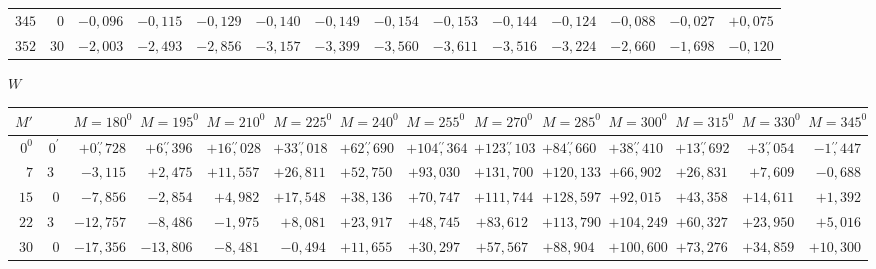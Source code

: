 \begin{landscape}
\begin{longtable}{@{}rr|r|r|r|r|r|r|r|r|r|r|r|r@{}}
\(345\) & \(0\) & \(-0{,}096\) & \(-0{,}115\) & \(-0{,}129\) & \(-0{,}140\) & \(-0{,}149\) & \(-0{,}154\) & \(-0{,}153\) & \(-0{,}144\) & \(-0{,}124\) & \(-0{,}088\) & \(-0{,}027\) & \(+0{,}075\)\\
\(352\) & \(30\) & \(-2{,}003\) & \(-2{,}493\) & \(-2{,}856\) & \(-3{,}157\) & \(-3{,}399\) & \(-3{,}560\) & \(-3{,}611\) & \(-3{,}516\) & \(-3{,}224\) & \(-2{,}660\) & \(-1{,}698\) & \(-0{,}120\)\\
\end{longtable}
\clearpage
\endgroup
\clearpage
\begingroup
\fontsize{8.5}{10.5}\selectfont
{}
\renewcommand{\headrulewidth}{0pt}
\begin{center}\(W\)\end{center}
\setlength{\tabcolsep}{2.5pt}
\renewcommand{\arraystretch}{1.08}
\begin{longtable}{@{}rr|r|r|r|r|r|r|r|r|r|r|r|r@{}}
\hline
\(M'\) & & \(M=180^0\) & \(M=195^0\) & \(M=210^0\) & \(M=225^0\) & \(M=240^0\) & \(M=255^0\) & \(M=270^0\) & \(M=285^0\) & \(M=300^0\) & \(M=315^0\) & \(M=330^0\) & \(M=345^0\)\\
\hline
\endhead
\(0^0\) & \(0^\prime\) & \(+0\overset{\prime\prime}{,}728\) & \(+6\overset{\prime\prime}{,}396\) & \(+16\overset{\prime\prime}{,}028\) & \(+33\overset{\prime\prime}{,}018\) & \(+62\overset{\prime\prime}{,}690\) & \(+104\overset{\prime\prime}{,}364\) & \(+123\overset{\prime\prime}{,}103\) & \(+84\overset{\prime\prime}{,}660\) & \(+38\overset{\prime\prime}{,}410\) & \(+13\overset{\prime\prime}{,}692\) & \(+3\overset{\prime\prime}{,}054\) & \(-1\overset{\prime\prime}{,}447\)\\
\(7\) & \(30\) & \(-3{,}115\) & \(+2{,}475\) & \(+11{,}557\) & \(+26{,}811\) & \(+52{,}750\) & \(+93{,}030\) & \(+131{,}700\) & \(+120{,}133\) & \(+66{,}902\) & \(+26{,}831\) & \(+7{,}609\) & \(-0{,}688\)\\
\(15\) & \(0\) & \(-7{,}856\) & \(-2{,}854\) & \(+4{,}982\) & \(+17{,}548\) & \(+38{,}136\) & \(+70{,}747\) & \(+111{,}744\) & \(+128{,}597\) & \(+92{,}015\) & \(+43{,}358\) & \(+14{,}611\) & \(+1{,}392\)\\
\(22\) & \(30\) & \(-12{,}757\) & \(-8{,}486\) & \(-1{,}975\) & \(+8{,}081\) & \(+23{,}917\) & \(+48{,}745\) & \(+83{,}612\) & \(+113{,}790\) & \(+104{,}249\) & \(+60{,}327\) & \(+23{,}950\) & \(+5{,}016\)\\[2pt]
\(30\) & \(0\) & \(-17{,}356\) & \(-13{,}806\) & \(-8{,}481\) & \(-0{,}494\) & \(+11{,}655\) & \(+30{,}297\) & \(+57{,}567\) & \(+88{,}904\) & \(+100{,}600\) & \(+73{,}276\) & \(+34{,}859\) & \(+10{,}300\)\\

\end{longtable}
\end{landscape}
